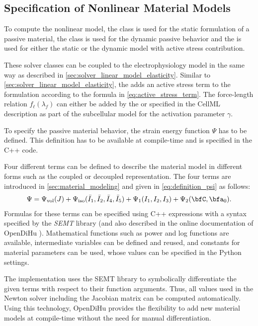 \subsection{Specification of Nonlinear Material Models}\label{sec:specification_of_nonlinear_ma}

To compute the nonlinear model, the  class is used for the static formulation of a passive material, the  class is used for the dynamic passive behavior and the  is used for either the static or the dynamic model with active stress contribution.

These solver classes can be coupled to the electrophysiology model in the same way as described in \cref{sec:solver_linear_model_elasticity}.
Similar to \cref{sec:solver_linear_model_elasticity}, the  adds an active stress term to the formulation according to the formula in \cref{eq:active_stress_term}. The force-length relation $f_\ell(\lambda_f)$ can either be added by the   or specified in the CellML description as part of the subcellular model for the activation parameter $\gamma$.

To specify the passive material behavior, the strain energy function $\Psi$ has to be defined.
This definition has to be available at compile-time and is specified in the C++ code. 

Four different terms can be defined to describe the material model in different forms such as the coupled or decoupled representation. The four terms are introduced in \cref{sec:material_modeling} and given in \cref{eq:definition_psi} as follows:
\begin{align}\label{eq:definition_psi1}
  \Psi = \Psi_\text{vol}(J) + \Psi_\text{iso}(\bar{I}_1,\bar{I}_2,\bar{I}_4,\bar{I}_5) + \Psi_1(I_1,I_2,I_3) + \Psi_2(\bfC,\bfa_0).
\end{align}
Formulas for these terms can be specified using C++ expressions with a syntax specified by the \emph{SEMT} library \cite{semt,gutterman2004symbolic} (and also described in the online documentation of OpenDiHu \cite{opendihuWeb}). Mathematical functions such as power and log functions are available, intermediate variables can be defined and reused, and constants for material parameters can be used, whose values can be specified in the Python settings.

The implementation uses the SEMT library to symbolically differentiate the given terms with respect to their function arguments. Thus, all values used in the Newton solver including the Jacobian matrix can be computed automatically. Using this technology, OpenDiHu provides the flexibility to add new material models at compile-time without the need for manual differentiation.

